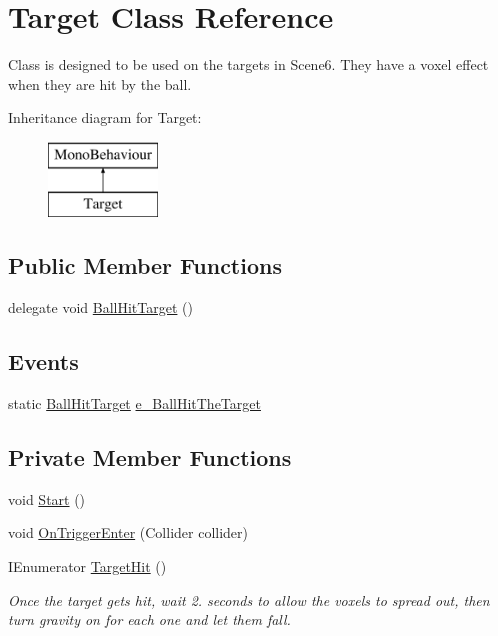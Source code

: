 \hypertarget{class_target}{}\section{Target Class Reference}
\label{class_target}


Class is designed to be used on the targets in Scene6. They have a voxel effect when they are hit by the ball.  


Inheritance diagram for Target\+:\begin{figure}[H]
\begin{center}
\leavevmode
\includegraphics[height=2.000000cm]{class_target}
\end{center}
\end{figure}
\subsection*{Public Member Functions}
\begin{DoxyCompactItemize}
\item 
delegate void \mbox{\hyperlink{class_target_a4f2a0b66fecc85bdcf301cc9ab926898}{Ball\+Hit\+Target}} ()
\end{DoxyCompactItemize}
\subsection*{Events}
\begin{DoxyCompactItemize}
\item 
static \mbox{\hyperlink{class_target_a4f2a0b66fecc85bdcf301cc9ab926898}{Ball\+Hit\+Target}} \mbox{\hyperlink{class_target_aa54347b745ba5f74774bda61839cce75}{e\+\_\+\+Ball\+Hit\+The\+Target}}
\end{DoxyCompactItemize}
\subsection*{Private Member Functions}
\begin{DoxyCompactItemize}
\item 
void \mbox{\hyperlink{class_target_a0f01237749302a315f5f9427524ac45a}{Start}} ()
\item 
void \mbox{\hyperlink{class_target_adac88a907571e0494bbafc363236a84e}{On\+Trigger\+Enter}} (Collider collider)
\item 
I\+Enumerator \mbox{\hyperlink{class_target_af48513275b10a25477fb07f499a4b596}{Target\+Hit}} ()
\begin{DoxyCompactList}\small\item\em Once the target gets hit, wait 2. seconds to allow the voxels to spread out, then turn gravity on for each one and let them fall. \end{DoxyCompactList}\end{DoxyCompactItemize}
